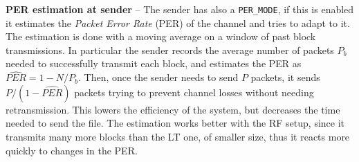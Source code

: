 \textbf{PER estimation at sender} -- 
The sender has also a \texttt{PER\_MODE}, if this is enabled it estimates the \textit{Packet Error Rate} (PER) of the channel and tries to adapt to it. The estimation is done with a moving average on a window of past block transmissions. In particular the sender records the average number of packets $P_b$ needed to successfully transmit each block, and estimates the PER as $\hat{PER} = 1 - N/P_b$. Then, once the sender needs to send $P$ packets, it sends $P/(1-\hat{PER})$ packets trying to prevent channel losses without needing retransmission. This lowers the efficiency of the system, but decreases the time needed to send the file. The estimation works better with the RF setup, since it transmits many more blocks than the LT one, of smaller size, thus it reacts more quickly to changes in the PER.

